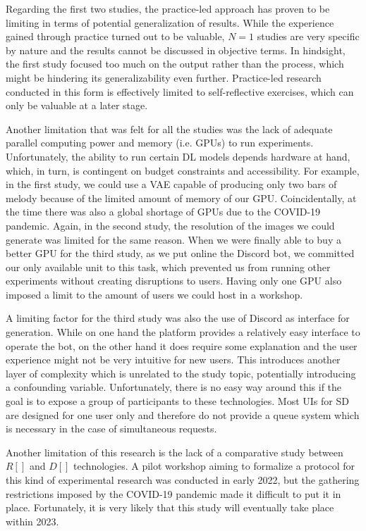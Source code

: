 Regarding the first two studies, the practice-led approach has proven to be limiting in terms of potential generalization of results. While the experience gained through practice turned out to be valuable, $N=1$ studies are very specific by nature and the results cannot be discussed in objective terms. In hindsight, the first study focused too much on the output rather than the process, which might be hindering its generalizability even further. Practice-led research conducted in this form is effectively limited to self-reflective exercises, which can only be valuable at a later stage. 
 
Another limitation that was felt for all the studies was the lack of adequate parallel computing power and memory (i.e. GPUs) to run experiments. Unfortunately, the ability to run certain DL models depends hardware at hand, which, in turn, is contingent on budget constraints and accessibility. For example, in the first study, we could use a VAE capable of producing only two bars of melody because of the limited amount of memory of our GPU. Coincidentally, at the time there was also a global shortage of GPUs due to the COVID-19 pandemic. Again, in the second study, the resolution of the images we could generate was limited for the same reason. When we were finally able to buy a better GPU for the third study, as we put online the Discord bot, we committed our only available unit to this task, which prevented us from running other experiments without creating disruptions to users. Having only one GPU also imposed a limit to the amount of users we could host in a workshop. 

A limiting factor for the third study was also the use of Discord as interface for generation. While on one hand the platform provides a relatively easy interface to operate the bot, on the other hand it does require some explanation and the user experience might not be very intuitive for new users. This introduces another layer of complexity which is unrelated to the study topic, potentially introducing a confounding variable. Unfortunately, there is no easy way around this if the goal is to expose a group of participants to these technologies. Most UIs for SD are designed for one user only and therefore do not provide a queue system which is necessary in the case of simultaneous requests.

Another limitation of this research is the lack of a comparative study between $R[]$ and $D[]$ technologies. A pilot workshop aiming to formalize a protocol for this kind of experimental research was conducted in early 2022, but the gathering restrictions imposed by the COVID-19 pandemic made it difficult to put it in place. Fortunately, it is very likely that this study will eventually take place within 2023.

